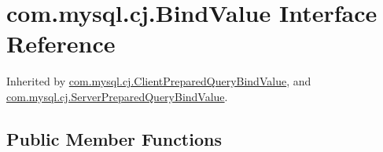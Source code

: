 \hypertarget{interfacecom_1_1mysql_1_1cj_1_1_bind_value}{}\section{com.\+mysql.\+cj.\+Bind\+Value Interface Reference}
\label{interfacecom_1_1mysql_1_1cj_1_1_bind_value}


Inherited by \mbox{\hyperlink{classcom_1_1mysql_1_1cj_1_1_client_prepared_query_bind_value}{com.\+mysql.\+cj.\+Client\+Prepared\+Query\+Bind\+Value}}, and \mbox{\hyperlink{classcom_1_1mysql_1_1cj_1_1_server_prepared_query_bind_value}{com.\+mysql.\+cj.\+Server\+Prepared\+Query\+Bind\+Value}}.

\subsection*{Public Member Functions}
